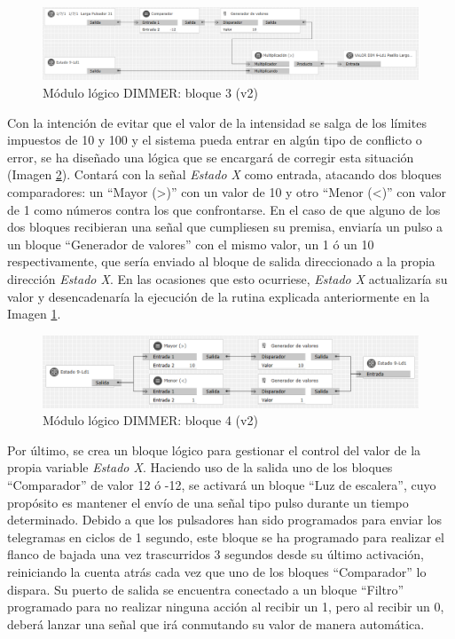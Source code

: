 \begin{figure}[H]
\includegraphics[width=1\textwidth]{figures/log_dimm_b23.png}  
\caption{Módulo lógico DIMMER: bloque 3 (v2)}
\label{fig:log_dimm_b23}
\end{figure}

Con la intención de evitar que el valor de la intensidad se salga de los límites impuestos de 10 y 100 y el sistema pueda entrar en algún tipo de conflicto o error, se ha diseñado una lógica que se encargará de corregir esta situación (Imagen \ref{fig:log_dimm_b24}). Contará con la señal \textit{Estado X} como entrada, atacando dos bloques comparadores: un “Mayor (>)” con un valor de 10 y otro “Menor (<)” con valor de 1 como números contra los que confrontarse. En el caso de que alguno de los dos bloques recibieran una señal que cumpliesen su premisa, enviaría un pulso a un bloque “Generador de valores” con el mismo valor, un 1 ó un 10 respectivamente, que sería enviado al bloque de salida direccionado a la propia dirección \textit{Estado X}. En las ocasiones que esto ocurriese, \textit{Estado X} actualizaría su valor y desencadenaría la ejecución de la rutina explicada anteriormente en la Imagen \ref{fig:log_dimm_b23}.

\begin{figure}[H]
\includegraphics[width=1\textwidth]{figures/log_dimm_b24.png}  
\caption{Módulo lógico DIMMER: bloque 4 (v2)}
\label{fig:log_dimm_b24}
\end{figure}

Por último, se crea un bloque lógico para gestionar el control del valor de la propia variable \textit{Estado X}. Haciendo uso de la salida uno de los bloques “Comparador” de valor 12 ó -12, se activará un bloque “Luz de escalera”, cuyo propósito es mantener el envío de una señal tipo pulso durante un tiempo determinado. Debido a que los pulsadores han sido programados para enviar los telegramas en ciclos de 1 segundo, este bloque se ha programado para realizar el flanco de bajada una vez trascurridos 3 segundos desde su último activación, reiniciando la cuenta atrás cada vez que uno de los bloques “Comparador” lo dispara. Su puerto de salida se encuentra conectado a un bloque “Filtro” programado para no realizar ninguna acción al recibir un 1, pero al recibir un 0, deberá lanzar una señal que irá conmutando su valor de manera automática.  

